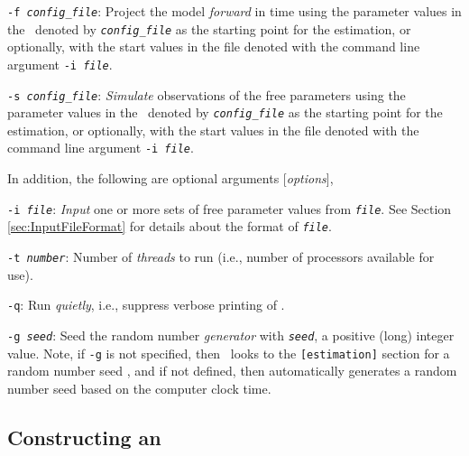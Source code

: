 \begin{description}
\item \texttt{-f \emph{config\_file}}:{\hspace{0.5cm} Project the model \emph{forward} in time using the parameter values in the \config\ denoted by \emph{\texttt{config\_file}} as the starting point for the estimation, or optionally, with the start values in the file denoted with the command line argument \texttt{-i \emph{file}}.}

\item \texttt{-s \emph{config\_file}}:{\hspace{0.5cm} \emph{Simulate} observations of the free parameters using the parameter values in the \config\ denoted by \emph{\texttt{config\_file}} as the starting point for the estimation, or optionally, with the start values in the file denoted with the command line argument \texttt{-i \emph{file}}.}

\end{description}

In addition, the following are optional arguments [\emph{options}],

\begin{description}
\item \texttt{-i \emph{file}}:{\hspace*{0.5cm} \emph{Input} one or more sets of free parameter values from \texttt{\emph{file}}. See Section \ref{sec:InputFileFormat} for details about the format of \texttt{\emph{file}}.}

\item \texttt{-t \emph{number}}:{\hspace*{0.5cm} Number of \emph{threads} to run (i.e., number of processors available for use).}

\item \texttt{-q}:{\hspace*{0.5cm} Run \emph{quietly}, i.e., suppress verbose printing of \SPM.}

\item \texttt{-g \emph{seed}}:{\hspace*{0.5cm} Seed the random number \emph{generator} with \texttt{\emph{seed}}, a positive (long) integer value. Note, if \texttt{-g} is not specified, then \SPM\ looks to the \texttt{[estimation]} section for a random number seed , and if not defined, then automatically generates a random number seed based on the computer clock time.}
\end{description}

\subsection{Constructing an \SPM\ \config \label{constructing-spm-config}}

